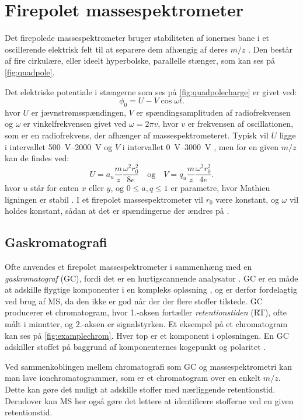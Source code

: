 \section{Firepolet massespektrometer}
Det firepolede massespektrometer bruger stabiliteten af ionernes bane i et oscillerende elektrisk felt til at separere dem afhængig af deres $m/z$ \parencite{massspec}.
Den består af fire cirkulære, eller ideelt hyperbolske, parallelle stænger, som kan ses på \cref{fig:quadpole}.

Det elektriske potentiale i stængerne som ses på \cref{fig:quadpolecharge} er givet ved:
\begin{equation}
	\phi_0 = U - V \cos{\omega t}.
\end{equation}
hvor $U$ er jævnstrømsspændingen, $V$ er spændingsamplituden af radiofrekvensen og $\omega$ er vinkelfrekvensen givet ved $\omega = 2\pi v$, hvor $v$ er frekvensen af oscillationen, som er en radiofrekvens, der afhænger af massespektrometeret.
Typisk vil $U$ ligge i intervallet \qtyrange{500}{2000}{\volt} og $V$ i intervallet \qtyrange{0}{3000}{\volt} \parencite{massspec}, men for en given $m/z$ kan de findes ved:
\begin{equation}
	U = a_u \frac{m}{z} \frac{\omega^2 r_0^2}{8e}\quad\text{og}\quad V = q_u \frac{m}{z} \frac{\omega^2 r_0^2}{4e}.
\end{equation}
hvor $u$ står for enten $x$ eller $y$, og $0 \leq a, q \leq 1$ er parametre, hvor Mathieu ligningen er stabil \parencite{mathieu,massspec}.
I et firepolet massespektrometer vil $r_0$ være konstant, og $\omega$ vil holdes konstant, sådan at det er spændingerne der ændres på \parencite{mstextbook}.
\subsection{Gaskromatografi}
Ofte anvendes et firepolet massespektrometer i sammenhæng med en \emph{gaskromatograf} (GC), fordi det er en hurtigscannende analysator \parencite{basicgaschrom}.
GC er en måde at adskille flygtige komponenter i en kompleks opløsning \parencite{mstextbook}, og er derfor fordelagtig ved brug af MS, da den ikke er god når der der flere stoffer tilstede.
GC producerer et chromatogram, hvor 1.-aksen fortæller \emph{retentionstiden} (RT), ofte målt i minutter, og 2.-aksen er signalstyrken.
Et eksempel på et chromatogram kan ses på \cref{fig:examplechrom}. Hver top er et komponent i opløsningen.
En GC adskiller stoffet på baggrund af komponenternes kogepunkt og polaritet \parencite{kromatografi}.

\par Ved sammenkoblingen mellem chromatografi som GC og massespektrometri kan man lave ionchromatogrammer, som er et chromatogram over en enkelt $m/z$.
Dette kan gøre det muligt at adskille stoffer med nærliggende retentionstid.
Derudover kan MS her også gøre det lettere at identificere stofferne ved en given retentionstid.
